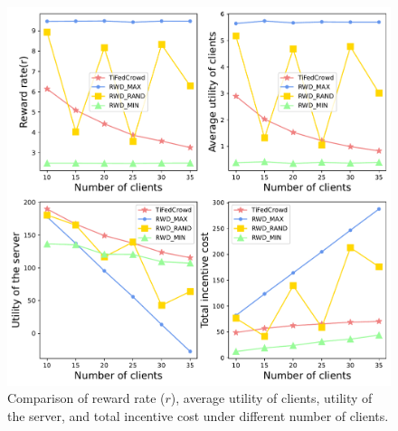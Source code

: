 \documentclass[final,1p,times]{elsarticle}
\begin{document}
\begin{figure}
	\centering
	\centerline{\includegraphics[width=5.5in]{fig3.pdf}}
	\caption{Comparison of reward rate ($r$), average utility of clients, utility of the server, and total incentive cost under different number of clients.}
	\label{fig:3}
\end{figure}
\end{document}
